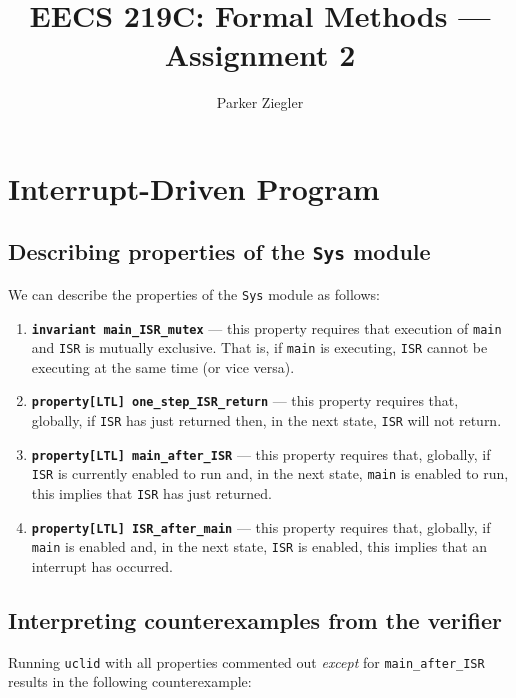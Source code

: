 \documentclass{article}
\title{EECS 219C: Formal Methods — Assignment 2}
\author{Parker Ziegler}
\newcommand{\code}[1]{\texttt{#1}}
\begin{document}
\maketitle

\section{Interrupt-Driven Program}

\subsection{Describing properties of the \code{Sys} module}

We can describe the properties of the \code{Sys} module as follows:

\begin{enumerate}
  \item \textbf{\code{invariant main\_ISR\_mutex}} — this property requires that execution of \code{main} and \code{ISR} is mutually exclusive. That is, if \code{main} is executing, \code{ISR} cannot be executing at the same time (or vice versa).
  \item \textbf{\code{property[LTL] one\_step\_ISR\_return}} — this property requires that, globally, if \code{ISR} has just returned then, in the next state, \code{ISR} will not return.
  \item \textbf{\code{property[LTL] main\_after\_ISR}} — this property requires that, globally, if \code{ISR} is currently enabled to run and, in the next state, \code{main} is enabled to run, this implies that \code{ISR} has just returned.
  \item \textbf{\code{property[LTL] ISR\_after\_main}} — this property requires that, globally, if \code{main} is enabled and, in the next state, \code{ISR} is enabled, this implies that an interrupt has occurred.
\end{enumerate}

\subsection{Interpreting counterexamples from the verifier}

Running \code{uclid} with all properties commented out \emph{except} for \code{main\_after\_ISR} results in the following counterexample:
\end{document}
